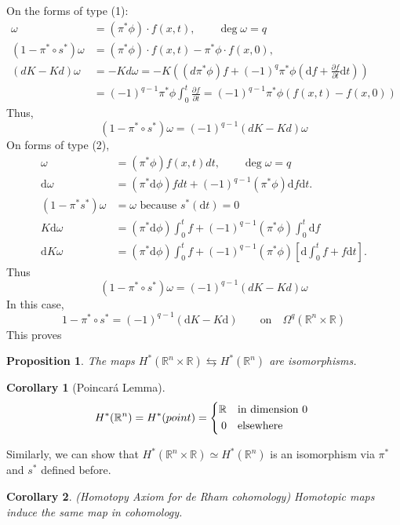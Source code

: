 \documentclass{article}
\newtheorem{proposition}{Proposition}[section]
\newtheorem{corollary}{Corollary}[proposition]
\begin{document}
On the forms of type (1):
\begin{align*}
    \omega&=(\pi^*\phi)\cdot f(x,t),\qquad \deg \omega =q\\
    (1-\pi^*\circ s^*)\omega&=(\pi^*\phi)\cdot f(x,t)-\pi^*\phi\cdot f(x,0),\\
    (dK-Kd)\omega&=-Kd\omega=-K\left((d\pi^*\phi)f+(-1)^q\pi^*\phi(\mathrm{d }f+\frac{\partial f}{\partial t}\mathrm{d }t)\right)\\
    &=(-1)^{q-1}\pi^*\phi\int_{0}^{t }\frac{\partial f}{\partial t}=(-1)^{q-1}\pi^*\phi(f(x,t)- f(x,0))
\end{align*}
Thus,
\[(1-\pi^*\circ s^*)\omega=(-1)^{q-1}(dK-Kd)\omega\]
On forms of type (2),
\begin{align*}
    \omega&=(\pi^*\phi)f(x,t)dt,\qquad \deg \omega =q\\
    \mathrm{d}\omega&=(\pi^*\mathrm{d}\phi)fdt+(-1)^{q-1}(\pi^*\phi)\mathrm{d}f\mathrm{d}t.\\
    (1-\pi^*s^*)\omega&=\omega\text{ because }s^*(\mathrm{d}t)=0\\
    K\mathrm{d}\omega&=(\pi^*\mathrm{d }\phi)\int_{0}^{t}f+(-1)^{q-1}(\pi^*\phi)\int_{0}^{t }\mathrm{d}f\\
    \mathrm{d}K\omega&=(\pi^*\mathrm{d }\phi)\int_{0}^{t}f+(-1)^{q-1}(\pi^*\phi)\left[\mathrm{d}\int_{0}^{t }f+f\mathrm{d}t\right].
\end{align*}
Thus
\[(1-\pi^*\circ s^*)\omega=(-1)^{q-1}(dK-Kd)\omega\]
In this case,
\[1-\pi^*\circ s^*=(-1)^{q-1}(\mathrm{d}K-K\mathrm{d})\qquad \text{on}\quad \Omega^q(\mathbb{R}^n\times\mathbb{R})\]
This proves
\begin{proposition}\label{prop1}
    The maps $ H^*(\mathbb{R}^n\times\mathbb{R})\leftrightarrows H^*(\mathbb{R }^n) $ are isomorphisms. 
\end{proposition}
\begin{corollary}[Poincar\'{a} Lemma]
    \[
        H^*(\mathbb{R}^n)=H^*(point)=\left\{
            \begin{aligned}
                \mathbb{R}&\quad \text{in dimension  $ 0 $ }\\
                0&\quad \text{elsewhere}
            \end{aligned}
        \right.
    \]
\end{corollary}
Similarly, we can show that $ H^*(\mathbb{R}^n\times\mathbb{R})\simeq  H^*(\mathbb{R }^n) $ is an isomorphism via  $ \pi^*  $ and  $ s^* $ defined before.
\begin{corollary}(Homotopy Axiom for de Rham cohomology)
    Homotopic maps induce the same map in cohomology.
\end{corollary}
\end{document}
